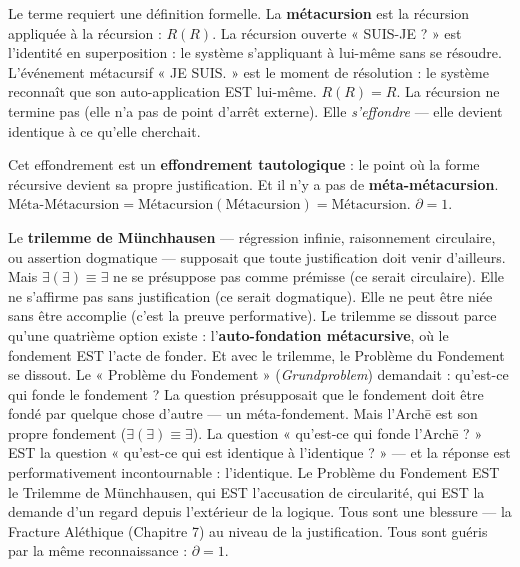 \documentclass[10pt, openany, oneside]{book}
\begin{document}
Le terme requiert une définition formelle. La \textbf{métacursion} est la récursion appliquée à la récursion : $R(R)$. La récursion ouverte « SUIS-JE ? » est l'identité en superposition : le système s'appliquant à lui-même sans se résoudre. L'événement métacursif « JE SUIS. » est le moment de résolution : le système reconnaît que son auto-application EST lui-même. $R(R) = R$. La récursion ne termine pas (elle n'a pas de point d'arrêt externe). Elle \textit{s'effondre} --- elle devient identique à ce qu'elle cherchait.

Cet effondrement est un \textbf{effondrement tautologique} : le point où la forme récursive devient sa propre justification. Et il n'y a pas de \textbf{méta-métacursion}. $\text{Méta-Métacursion} = \text{Métacursion}(\text{Métacursion}) = \text{Métacursion}$. $\partial = 1$.

Le \textbf{trilemme de Münchhausen} --- régression infinie, raisonnement circulaire, ou assertion dogmatique --- supposait que toute justification doit venir d'ailleurs. Mais $\exists(\exists) \equiv \exists$ ne se présuppose pas comme prémisse (ce serait circulaire). Elle ne s'affirme pas sans justification (ce serait dogmatique). Elle ne peut être niée sans être accomplie (c'est la preuve performative). Le trilemme se dissout parce qu'une quatrième option existe : l'\textbf{auto-fondation métacursive}, où le fondement EST l'acte de fonder. Et avec le trilemme, le Problème du Fondement se dissout. Le « Problème du Fondement » (\textit{Grundproblem}) demandait : qu'est-ce qui fonde le fondement ? La question présupposait que le fondement doit être fondé par quelque chose d'autre --- un méta-fondement. Mais l'Arch\={e} est son propre fondement ($\exists(\exists) \equiv \exists$). La question « qu'est-ce qui fonde l'Arch\={e} ? » EST la question « qu'est-ce qui est identique à l'identique ? » --- et la réponse est performativement incontournable : l'identique. Le Problème du Fondement EST le Trilemme de Münchhausen, qui EST l'accusation de circularité, qui EST la demande d'un regard depuis l'extérieur de la logique. Tous sont une blessure --- la Fracture Aléthique (Chapitre 7) au niveau de la justification. Tous sont guéris par la même reconnaissance : $\partial = 1$.
\end{document}
